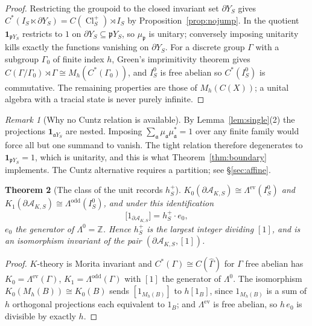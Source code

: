 \documentclass[11pt]{amsart}
\numberwithin{equation}{section}
\newtheorem{theorem}{Theorem}[section]
\theoremstyle{definition}
\theoremstyle{remark}
\newtheorem{remark}[theorem]{Remark}
\newcommand{\Z}{\mathbb{Z}}
\newcommand{\cA}{\mathcal{A}}
\newcommand{\pp}{\mathfrak{p}}
\newcommand{\aaa}{\mathfrak{a}}
\newcommand{\Cl}{\operatorname{Cl}}
\begin{document}
\begin{proof}
Restricting the groupoid to the closed invariant set $\partial Y_S$ gives
$C^*(I_S\ltimes\partial Y_S)=C(\Cl^+_S)\rtimes I_S$ by Proposition~\ref{prop:nojump}. In the
quotient $\mathbf 1_{\pp Y_S}$ restricts to $1$ on $\partial Y_S\subseteq\pp Y_S$, so
$\mu_\pp$ is unitary; conversely imposing unitarity kills exactly the functions vanishing on
$\partial Y_S$. For a discrete group $\Gamma$ with a subgroup $\Gamma_0$ of finite index $h$,
Green's imprimitivity theorem \cite{Green} gives $C(\Gamma/\Gamma_0)\rtimes\Gamma\cong M_h(C^*(\Gamma_0))$,
and $I_S^0$ is free abelian so $C^*(I_S^0)$ is commutative. The remaining properties are
those of $M_h(C(X))$; a unital algebra with a tracial state is never purely infinite.
\end{proof}

\begin{remark}[Why no Cuntz relation is available]\label{rem:nocuntz}
By Lemma~\ref{lem:single}(2) the projections $\mathbf 1_{\aaa Y_S}$ are nested. Imposing
$\sum_\aaa\mu_\aaa\mu_\aaa^*=1$ over any finite family would force all but one summand to
vanish. The tight relation therefore degenerates to $\mathbf 1_{\pp Y_S}=1$, which is
unitarity, and this is what Theorem~\ref{thm:boundary} implements. The Cuntz alternative
requires a partition; see \S\ref{sec:affine}.
\end{remark}

\begin{theorem}[The class of the unit records $h^+_S$]\label{thm:Kboundary}
$K_0(\partial\cA_{K,S})\cong\Lambda^{\mathrm{ev}}(I_S^0)$ and
$K_1(\partial\cA_{K,S})\cong\Lambda^{\mathrm{odd}}(I_S^0)$, and under this identification
\begin{equation}\label{eq:unit}
\bigl[1_{\partial\cA_{K,S}}\bigr]=h^+_S\cdot e_0 ,
\end{equation}
$e_0$ the generator of $\Lambda^0=\Z$. Hence $h^+_S$ is the largest integer dividing $[1]$,
and is an isomorphism invariant of the pair $(\partial\cA_{K,S},[1])$.
\end{theorem}

\begin{proof}
$K$-theory is Morita invariant and $C^*(\Gamma)\cong C(\widehat\Gamma)$ for $\Gamma$ free
abelian has $K_0=\Lambda^{\mathrm{ev}}(\Gamma)$, $K_1=\Lambda^{\mathrm{odd}}(\Gamma)$ with
$[1]$ the generator of $\Lambda^0$. The isomorphism $K_0(M_h(B))\cong K_0(B)$ sends
$[1_{M_h(B)}]$ to $h[1_B]$, since $1_{M_h(B)}$ is a sum of $h$ orthogonal projections each
equivalent to $1_B$; and $\Lambda^{\mathrm{ev}}$ is free abelian, so $h\,e_0$ is divisible by
exactly $h$.
\end{proof}
\end{document}
